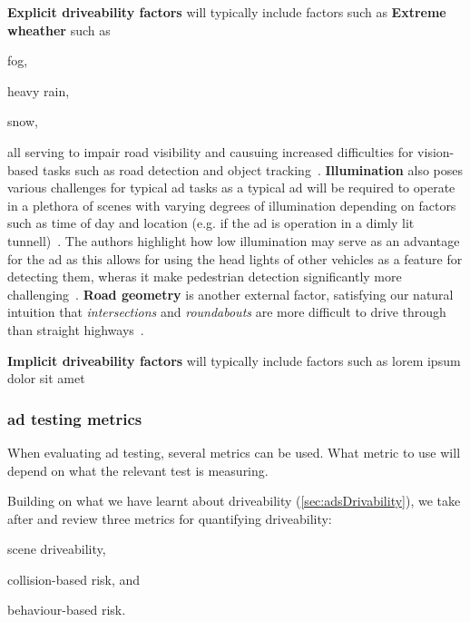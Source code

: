 \textbf{Explicit driveability factors} will typically include factors such as
\textbf{Extreme wheather} such as \begin{inparaenum}
    \item fog,
    \item heavy rain,
    \item snow,
\end{inparaenum}
all serving to impair road visibility and causuing increased difficulties for
vision-based tasks such as road detection and object
tracking~\cite[3136-3137]{safeToDrive}. \textbf{Illumination} also poses
various challenges for typical \acrshort{ad} tasks as a typical \acrshort{ad}
will be required to operate in a plethora of scenes with varying degrees of
illumination depending on factors such as time of day and location (e.g. if the
\acrshort{ad} is operation in a dimly lit tunnell)~\cite[3137]{safeToDrive}. The
authors highlight how low illumination may serve as an advantage for the
\acrshort{ad} as this allows for using the head lights of other vehicles as a
feature for detecting them, wheras it make pedestrian detection significantly
more challenging~\cite[3137]{safeToDrive}. \textbf{Road geometry} is another
external factor, satisfying our natural intuition that \textit{intersections}
and \textit{roundabouts} are more difficult to drive through than straight
highways~\cite[3137]{safeToDrive}.

\textbf{Implicit driveability factors} will typically include factors such as
lorem ipsum dolor sit amet

\subsubsection*{\acrlong{ad} testing metrics}\label{sec:adsMetrics}

When evaluating \acrshort{ad} testing, several metrics can be used. What metric to use will depend
on what the relevant test is measuring.

Building on what we have learnt about driveability (\cref{sec:adsDrivability}),
we take after \citeauthor{safeToDrive} and review three metrics for
quantifying driveability: \begin{inparaenum}
    \item scene driveability,
    \item collision-based risk, and
    \item behaviour-based risk.
\end{inparaenum}

